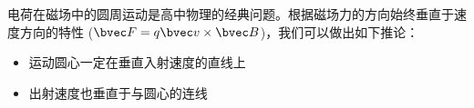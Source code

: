 
电荷在磁场中的圆周运动是高中物理的经典问题。根据磁场力的方向始终垂直于速度方向的特性 ($\bvec F = q\bvec v \times \bvec B$)，我们可以做出如下推论：
\begin{itemize}
\item 运动圆心一定在垂直入射速度的直线上
\item 出射速度也垂直于与圆心的连线
\end{itemize}
